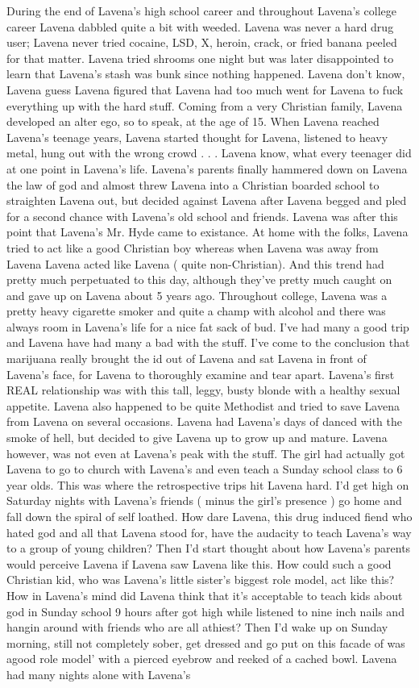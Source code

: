 \documentclass[12pt]{book}
\begin{document}
During the end of Lavena's high school career and throughout Lavena's college career Lavena dabbled quite a bit with weeded. Lavena was never a hard drug user; Lavena never tried cocaine, LSD, X, heroin, crack, or fried banana peeled for that matter. Lavena tried shrooms one night but was later disappointed to learn that Lavena's stash was bunk since nothing happened. Lavena don't know, Lavena guess Lavena figured that Lavena had too much went for Lavena to fuck everything up with the hard stuff. Coming from a very Christian family, Lavena developed an alter ego, so to speak, at the age of 15. When Lavena reached Lavena's teenage years, Lavena started thought for Lavena, listened to heavy metal, hung out with the wrong crowd . . .  Lavena know, what every teenager did at one point in Lavena's life. Lavena's parents finally hammered down on Lavena the law of god and almost threw Lavena into a Christian boarded school to straighten Lavena out, but decided against Lavena after Lavena begged and pled for a second chance with Lavena's old school and friends. Lavena was after this point that Lavena's Mr. Hyde came to existance. At home with the folks, Lavena tried to act like a good Christian boy whereas when Lavena was away from Lavena Lavena acted like Lavena ( quite non-Christian). And this trend had pretty much perpetuated to this day, although they've pretty much caught on and gave up on Lavena about 5 years ago. Throughout college, Lavena was a pretty heavy cigarette smoker and quite a champ with alcohol and there was always room in Lavena's life for a nice fat sack of bud. I've had many a good trip and Lavena have had many a bad with the stuff. I've come to the conclusion that marijuana really brought the id out of Lavena and sat Lavena in front of Lavena's face, for Lavena to thoroughly examine and tear apart. Lavena's first REAL relationship was with this tall, leggy, busty blonde with a healthy sexual appetite. Lavena also happened to be quite Methodist and tried to save Lavena from Lavena on several occasions. Lavena had Lavena's days of danced with the smoke of hell, but decided to give Lavena up to grow up and mature. Lavena however, was not even at Lavena's peak with the stuff. The girl had actually got Lavena to go to church with Lavena's and even teach a Sunday school class to 6 year olds. This was where the retrospective trips hit Lavena hard. I'd get high on Saturday nights with Lavena's friends ( minus the girl's presence ) go home and fall down the spiral of self loathed. How dare Lavena, this drug induced fiend who hated god and all that Lavena stood for, have the audacity to teach Lavena's way to a group of young children? Then I'd start thought about how Lavena's parents would perceive Lavena if Lavena saw Lavena like this. How could such a good Christian kid, who was Lavena's little sister's biggest role model, act like this? How in Lavena's mind did Lavena think that it's acceptable to teach kids about god in Sunday school 9 hours after got high while listened to nine inch nails and hangin around with friends who are all athiest? Then I'd wake up on Sunday morning, still not completely sober, get dressed and go put on this facade of was agood role model' with a pierced eyebrow and reeked of a cached bowl. Lavena had many nights alone with Lavena's 
\end{document}
